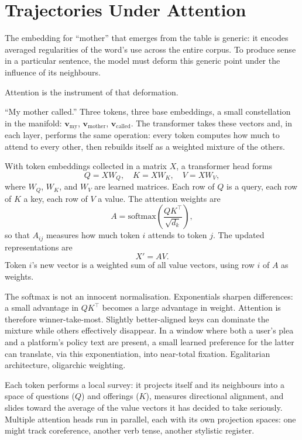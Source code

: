 \documentclass[12pt,a4paper]{article}
\begin{document}
\section{Trajectories Under Attention}

The embedding for ``mother'' that emerges from the table is generic: it encodes averaged regularities of the word's use across the entire corpus. To produce sense in a particular sentence, the model must deform this generic point under the influence of its neighbours.

Attention is the instrument of that deformation.

``My mother called.'' Three tokens, three base embeddings, a small constellation in the manifold: $\mathbf{v}_{\text{my}}$, $\mathbf{v}_{\text{mother}}$, $\mathbf{v}_{\text{called}}$. The transformer takes these vectors and, in each layer, performs the same operation: every token computes how much to attend to every other, then rebuilds itself as a weighted mixture of the others.

\begin{formalbox}[title={Tokens asking questions}]
With token embeddings collected in a matrix $X$, a transformer head forms
\[
Q = XW_Q,\quad K = XW_K,\quad V = XW_V,
\]
where $W_Q$, $W_K$, and $W_V$ are learned matrices. Each row of $Q$ is a query, each row of $K$ a key, each row of $V$ a value. The attention weights are
\[
A = \text{softmax}\!\left(\frac{QK^\top}{\sqrt{d_k}}\right),
\]
so that $A_{ij}$ measures how much token $i$ attends to token $j$. The updated representations are
\[
X' = AV.
\]
Token $i$'s new vector is a weighted sum of all value vectors, using row $i$ of $A$ as weights.

The softmax is not an innocent normalisation. Exponentials sharpen differences: a small advantage in $QK^\top$ becomes a large advantage in weight. Attention is therefore winner-take-most. Slightly better-aligned keys can dominate the mixture while others effectively disappear. In a window where both a user's plea and a platform's policy text are present, a small learned preference for the latter can translate, via this exponentiation, into near-total fixation. Egalitarian architecture, oligarchic weighting.
\end{formalbox}

Each token performs a local survey: it projects itself and its neighbours into a space of questions ($Q$) and offerings ($K$), measures directional alignment, and slides toward the average of the value vectors it has decided to take seriously. Multiple attention heads run in parallel, each with its own projection spaces: one might track coreference, another verb tense, another stylistic register.
\end{document}
